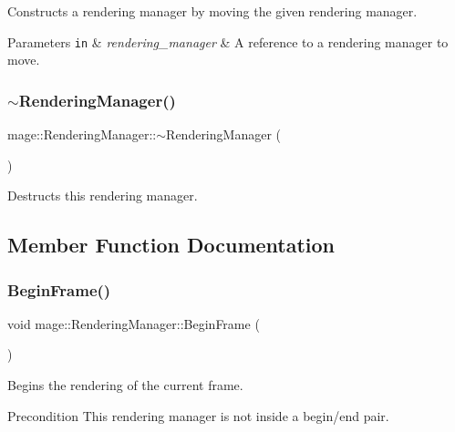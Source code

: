 Constructs a rendering manager by moving the given rendering manager.


\begin{DoxyParams}[1]{Parameters}
\mbox{\tt in}  & {\em rendering\+\_\+manager} & A reference to a rendering manager to move. \\
\hline
\end{DoxyParams}
\hypertarget{classmage_1_1_rendering_manager_a4164e70f014de8d0348c35d5142cedab}{}\label{classmage_1_1_rendering_manager_a4164e70f014de8d0348c35d5142cedab} 
\subsubsection{\texorpdfstring{$\sim$\+Rendering\+Manager()}{~RenderingManager()}}
{\footnotesize\ttfamily mage\+::\+Rendering\+Manager\+::$\sim$\+Rendering\+Manager (\begin{DoxyParamCaption}{ }\end{DoxyParamCaption})}

Destructs this rendering manager. 

\subsection{Member Function Documentation}
\hypertarget{classmage_1_1_rendering_manager_a740120ccc38cd9a4b2e7f72ad97ef898}{}\label{classmage_1_1_rendering_manager_a740120ccc38cd9a4b2e7f72ad97ef898} 
\subsubsection{\texorpdfstring{Begin\+Frame()}{BeginFrame()}}
{\footnotesize\ttfamily void mage\+::\+Rendering\+Manager\+::\+Begin\+Frame (\begin{DoxyParamCaption}{ }\end{DoxyParamCaption})\hspace{0.3cm}{\ttfamily [noexcept]}}

Begins the rendering of the current frame.

\begin{DoxyPrecond}{Precondition}
This rendering manager is not inside a begin/end pair. 
\end{DoxyPrecond}
\hypertarget{classmage_1_1_rendering_manager_aeb6a79f1629a89c66732de9a5952df00}{}\label{classmage_1_1_rendering_manager_aeb6a79f1629a89c66732de9a5952df00} 
